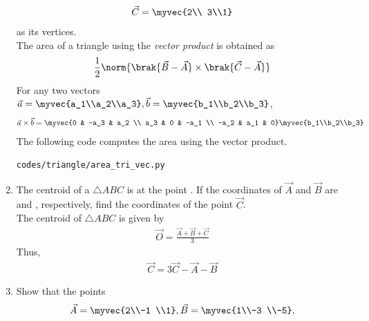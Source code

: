 \begin{enumerate}[label=\arabic*.,ref=\thesubsection.\theenumi]
\begin{align}
\vec{C} = \myvec{2\\ 3\\1}
\end{align}
%
as its vertices.
\\
\solution The area of a triangle using the {\em vector product} is obtained as
\begin{align}
\frac{1}{2}\norm{\brak{\vec{B}-\vec{A}}\times \brak{\vec{C}-\vec{A}}}
\end{align}
%
For any two vectors $\vec{a}=\myvec{a_1\\a_2\\a_3}, \vec{b}=\myvec{b_1\\b_2\\b_3}$, 
\begin{align}
\label{eq:tri_cross_prod}
\vec{a}\times \vec{b} = \myvec{0 & -a_3 & a_2 \\ a_3 & 0 & -a_1 \\ -a_2 & a_1 & 0}\myvec{b_1\\b_2\\b_3}
\end{align}
%
The following code computes the area using the vector product.
%
\begin{lstlisting}
codes/triangle/area_tri_vec.py
\end{lstlisting}
%
%
\item The centroid of a $\triangle ABC$ is at the point .  If the coordinates of $\vec{A}$ and $\vec{B}$ are  and , respectively, find the coordinates of the point $\vec{C}$.
%
\\
\solution The centroid of $\triangle ABC$ is given by
\begin{align}
\label{eq:tri_geo_ex_centroid}
\vec{O} = \frac{\vec{A}+\vec{B}+\vec{C}}{3}
\end{align}
%
Thus, 
\begin{align}
\vec{C} = 3\vec{C}-\vec{A}-\vec{B}
\end{align}
%
\item Show that the points 
\begin{align}
\vec{A} = \myvec{2\\-1 \\1},
\vec{B} = \myvec{1\\-3 \\-5},

\end{align}
\end{enumerate}
